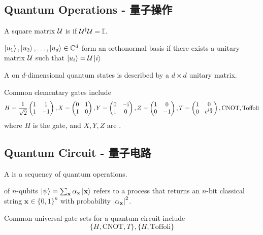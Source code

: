 \subsection{Quantum Operations - 量子操作}
\begin{definition}
    A square matrix $\mathcal{U}$ is  if $\mathcal{U}^{\dagger}\mathcal{U} = \mathbb{I}$.
\end{definition}
\begin{lemma}
    $\ket{u_1}, \ket{u_2}, \dots, \ket{u_d} \in \mathbb{C}^d$ form an orthonormal basis if there exists a unitary matrix $\mathcal{U}$ such that $\ket{u_i} = \mathcal{U} \ket{i}$
\end{lemma}
\begin{definition}
    A  on $d$-dimensional quantum states is described by a $d \times d$ unitary matrix.
\end{definition}
Common elementary gates include
$$H = \frac{1}{\sqrt{2}}\begin{pmatrix}
    1 & 1 \\
    1 & -1
\end{pmatrix}, X = \begin{pmatrix}
    0 & 1 \\
    1 & 0
\end{pmatrix}, Y = \begin{pmatrix}
    0 & -\mathrm{i} \\
    \mathrm{i} & 0
\end{pmatrix}, Z = \begin{pmatrix}
    1 & 0 \\
    0 & -1
\end{pmatrix}, T = \begin{pmatrix}
    1 & 0 \\
    0 & e^{\mathrm{i} \frac{\pi}{4}}
\end{pmatrix}, \text{CNOT}, \text{Toffoli}$$
where $H$ is the  gate, and $X, Y, Z$ are .

\subsection{Quantum Circuit - 量子电路}
\begin{definition}
    A  is a sequency of quantum operations.
\end{definition}
\begin{definition}
     of $n$-qubits  $\ket{\psi} = \sum_{\mathbf{x}} \alpha_{\mathbf{x}}\ket{\mathbf{x}}$ refers to a process that returns an $n$-bit classical string $\mathbf{x} \in \{0, 1\}^n$ with probability $\abs{\alpha_{\mathbf{x}}}^2$.
\end{definition}
Common universal gate sets for a quantum circuit include
$$\{H, \text{CNOT}, T\}, \{H, \text{Toffoli}\}$$

